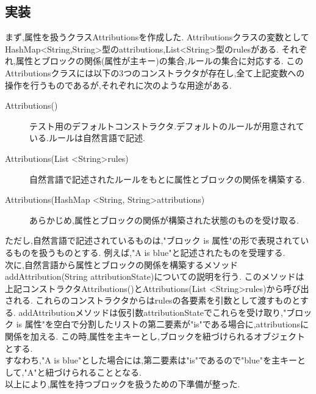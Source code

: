 \documentclass[uplatex,12pt]{jsarticle}
\begin{document}
\subsection{実装}
まず,属性を扱うクラスAttributionsを作成した.
Attributionsクラスの変数としてHashMap<String,String>型のattributions,List<String>型のrulesがある.
それぞれ,属性とブロックの関係(属性が主キー)の集合,ルールの集合に対応する.
このAttributionsクラスには以下の3つのコンストラクタが存在し,全て上記変数への操作を行うものであるが,それぞれに次のような用途がある.

\begin{description}
    \item[Attributions()] テスト用のデフォルトコンストラクタ.デフォルトのルールが用意されている.ルールは自然言語で記述.
    \item[Attributions(List \textless String\textgreater rules)] 自然言語で記述されたルールをもとに属性とブロックの関係を構築する.
    \item[Attributions(HashMap \textless String, String\textgreater attributions)] あらかじめ,属性とブロックの関係が構築された状態のものを受け取る.
\end{description}
ただし,自然言語で記述されているものは,"ブロック is 属性"の形で表現されているものを扱うものとする.
例えば,"A is blue"と記述されたものを受理する. \\

次に,自然言語から属性とブロックの関係を構築するメソッドaddAttribution(String attributionState)についての説明を行う.
このメソッドは上記コンストラクタAttributions()とAttributions(List \textless String\textgreater rules)から呼び出される.
これらのコンストラクタからはrulesの各要素を引数として渡すものとする.
addAttributionメソッドは仮引数attributionStateでこれらを受け取り,"ブロック is 属性"を空白で分割したリストの第二要素が"is"である場合に,attributionsに関係を加える.
この時,属性を主キーとし,ブロックを紐づけられるオブジェクトとする. \\
すなわち,"A is blue"とした場合には,第二要素は"is"であるので"blue"を主キーとして,"A"と紐づけられることとなる. \\

以上により,属性を持つブロックを扱うための下準備が整った. \\
\end{document}
